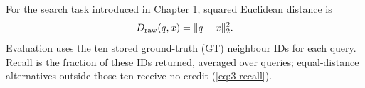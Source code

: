 For the search task introduced in Chapter 1, squared Euclidean distance is
\begin{equation}
 D_{\mathrm{raw}}(q,x)=\|q-x\|_2^2.
 \label{eq:2-raw}
\end{equation}
Evaluation uses the ten stored ground-truth (GT) neighbour IDs for each
query. Recall is the fraction of these IDs returned, averaged over
queries; equal-distance alternatives outside those ten receive no credit
(\cref{eq:3-recall}).
